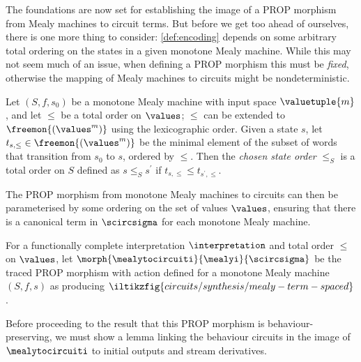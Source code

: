 The foundations are now set for establishing the image of a PROP morphism from
Mealy machines to circuit terms.
But before we get too ahead of ourselves, there is one more thing to consider:
\cref{def:encoding} depends on some arbitrary total ordering on the states in a
given monotone Mealy machine.
While this may not seem much of an issue, when
defining a PROP morphism this must be \emph{fixed}, otherwise the mapping of
Mealy machines to circuits might be nondeterministic.

\begin{definition}
    Let \((S, f, s_0)\) be a monotone Mealy machine with input space
    \(\valuetuple{m}\), and let \(\leq\) be a total order on \(\values\);
    \(\leq\) can be extended to \(\freemon{(\values^m)}\) using the
    lexicographic order.
    Given a state \(s\), let \(t_{s,\leq} \in \freemon{(\values^m)}\) be
    the minimal element of the subset of words that transition from \(s_0\) to
    \(s\), ordered by \(\leq\).
    Then the \emph{chosen state order} \(\leq_S\) is a total order on \(S\)
    defined as \(s \leq_S s^\prime\) if \(t_{s,\leq} \leq t_{s^\prime,\leq}\).
\end{definition}

The PROP morphism from monotone Mealy machines to circuits can then be
parameterised by some ordering on the set of values \(\values\), ensuring that
there is a canonical term in \(\scircsigma\) for each monotone Mealy machine.

\begin{definition}\label{def:mealy-to-circuit}
    For a functionally complete interpretation \(\interpretation\) and total
    order \(\leq\) on \(\values\), let \(
    \morph{
        \mealytocircuiti
    }{
        \mealyi
    }{
        \scircsigma
    }
    \) be the traced PROP morphism with action defined for a monotone Mealy
    machine \((S,f,s)\) as producing \(
    \iltikzfig{circuits/synthesis/mealy-term-spaced}
    \).
\end{definition}

Before proceeding to the result that this PROP morphism is behaviour-preserving,
we must show a lemma linking the behaviour circuits in the image of
\(\mealytocircuiti\) to initial outputs and stream derivatives.

